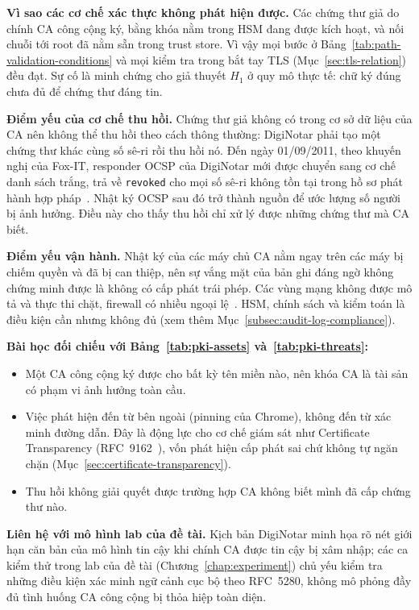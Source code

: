 \noindent\textbf{Vì sao các cơ chế xác thực không phát hiện được.} Các chứng thư giả do chính CA công cộng ký, bằng khóa nằm trong HSM đang được kích hoạt, và nối chuỗi tới root đã nằm sẵn trong trust store. Vì vậy mọi bước ở Bảng~\ref{tab:path-validation-conditions} và mọi kiểm tra trong bắt tay TLS (Mục~\ref{sec:tls-relation}) đều đạt. Sự cố là minh chứng cho giả thuyết $H_1$ ở quy mô thực tế: chữ ký đúng chưa đủ để chứng thư đáng tin.

\noindent\textbf{Điểm yếu của cơ chế thu hồi.} Chứng thư giả không có trong cơ sở dữ liệu của CA nên không thể thu hồi theo cách thông thường: DigiNotar phải tạo một chứng thư khác cùng số sê-ri rồi thu hồi nó. Đến ngày 01/09/2011, theo khuyến nghị của Fox-IT, responder OCSP của DigiNotar mới được chuyển sang cơ chế danh sách trắng, trả về \texttt{revoked} cho mọi số sê-ri không tồn tại trong hồ sơ phát hành hợp pháp~\cite{prins2011diginotar}. Nhật ký OCSP sau đó trở thành nguồn để ước lượng số người bị ảnh hưởng. Điều này cho thấy thu hồi chỉ xử lý được những chứng thư mà CA biết.

\noindent\textbf{Điểm yếu vận hành.} Nhật ký của các máy chủ CA nằm ngay trên các máy bị chiếm quyền và đã bị can thiệp, nên sự vắng mặt của bản ghi đáng ngờ không chứng minh được là không có cấp phát trái phép. Các vùng mạng không được mô tả và thực thi chặt, firewall có nhiều ngoại lệ~\cite{prins2011diginotar}. HSM, chính sách và kiểm toán là điều kiện cần nhưng không đủ (xem thêm Mục~\ref{subsec:audit-log-compliance}).

\noindent\textbf{Bài học đối chiếu với Bảng~\ref{tab:pki-assets} và~\ref{tab:pki-threats}:}
\begin{itemize}\setlength{\itemsep}{1pt}\setlength{\parskip}{0pt}
    \item Một CA công cộng ký được cho bất kỳ tên miền nào, nên khóa CA là tài sản có phạm vi ảnh hưởng toàn cầu.
    \item Việc phát hiện đến từ bên ngoài (pinning của Chrome), không đến từ xác minh đường dẫn. Đây là động lực cho cơ chế giám sát như Certificate Transparency (RFC~9162~\cite{rfc9162}), vốn phát hiện cấp phát sai chứ không tự ngăn chặn (Mục~\ref{sec:certificate-transparency}).
    \item Thu hồi không giải quyết được trường hợp CA không biết mình đã cấp chứng thư nào.
\end{itemize}

\noindent\textbf{Liên hệ với mô hình lab của đề tài.} Kịch bản DigiNotar minh họa rõ nét giới hạn căn bản của mô hình tin cậy khi chính CA được tin cậy bị xâm nhập; các ca kiểm thử trong lab của đề tài (Chương~\ref{chap:experiment}) chủ yếu kiểm tra những điều kiện xác minh ngữ cảnh cục bộ theo RFC~5280, không mô phỏng đầy đủ tình huống CA công cộng bị thỏa hiệp toàn diện.

